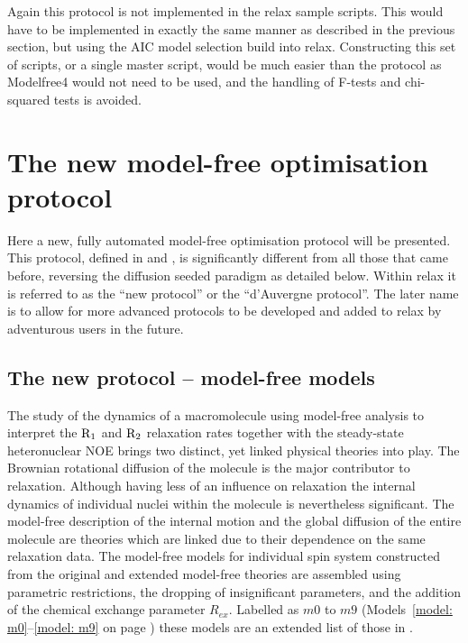 \begin{htmlonly}
\begin{htmlonly}
Again this protocol is not implemented in the relax sample scripts.
This would have to be implemented in exactly the same manner as described in the previous section, but using the AIC model selection build into relax.
Constructing this set of scripts, or a single master script, would be much easier than the \citet{Mandel95} protocol as Modelfree4 would not need to be used, and the handling of F-tests and chi-squared tests is avoided.




\section{The new model-free optimisation protocol}
\label{sect: new model-free protocol}

Here a new, fully automated model-free optimisation protocol will be presented.
This protocol, defined in \citet{dAuvergneGooley07} and \citet{dAuvergneGooley08b}, is significantly different from all those that came before, reversing the diffusion seeded paradigm as detailed below.
Within relax it is referred to as the ``new protocol'' or the ``d'Auvergne protocol''.
The later name is to allow for more advanced protocols to be developed and added to relax by adventurous users in the future.



\subsection{The new protocol -- model-free models}

The study of the dynamics of a macromolecule using model-free analysis to interpret the $\mathrm{R}_1$ and $\mathrm{R}_2$ relaxation rates together with the steady-state heteronuclear NOE brings two distinct, yet linked physical theories into play.
The Brownian rotational diffusion of the molecule is the major contributor to relaxation.
Although having less of an influence on relaxation the internal dynamics of individual nuclei within the molecule is nevertheless significant.
The model-free description of the internal motion and the global diffusion of the entire molecule are theories which are linked due to their dependence on the same relaxation data.
The model-free models for individual spin system constructed from the original and extended model-free theories \citep{LipariSzabo82a, LipariSzabo82b, Clore90a} are assembled using parametric restrictions, the dropping of insignificant parameters, and the addition of the chemical exchange parameter $R_{ex}$.
Labelled as $m0$ to $m9$ (Models~\ref{model: m0}--\ref{model: m9} on page \pageref{model: m9}) these models are an extended list of those in \citep{Fushman97, Orekhov99b, Korzhnev01, Zhuravleva04}.




\end{htmlonly}
\end{htmlonly}
